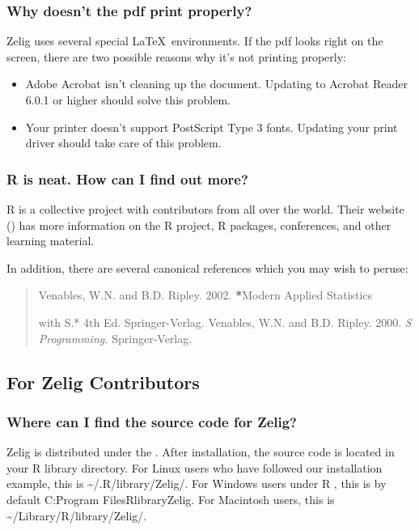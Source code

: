 \documentclass[letterpaper,10pt,english]{sphinxmanual}
\begin{document}
\subsubsection{Why doesn’t the pdf print properly?}
\label{docs/faq:why-doesnt-the-pdf-print-properly}
Zelig uses several special LaTeX environments. If the pdf looks right on
the screen, there are two possible reasons why it’s not printing
properly:
\begin{itemize}
\item {} 
Adobe Acrobat isn’t cleaning up the document. Updating to Acrobat
Reader 6.0.1 or higher should solve this problem.

\item {} 
Your printer doesn’t support PostScript Type 3 fonts. Updating your
print driver should take care of this problem.

\end{itemize}


\subsubsection{R is neat. How can I find out more?}
\label{docs/faq:r-is-neat-how-can-i-find-out-more}
R is a collective project with contributors from all over the world.
Their website () has more information on the R project, R packages,
conferences, and other learning material.

In addition, there are several canonical references which you may wish
to peruse:
\begin{quote}

\begin{DUlineblock}{0em}
\item[] Venables, W.N. and B.D. Ripley. 2002. {\color{red}\bfseries{}*}Modern Applied Statistics
\end{DUlineblock}

with S.* 4th Ed. Springer-Verlag.
\textbar{} Venables, W.N. and B.D. Ripley. 2000. \emph{S Programming.}
Springer-Verlag.
\end{quote}


\subsection{For Zelig Contributors}
\label{docs/faq:for-zelig-contributors}

\subsubsection{Where can I find the source code for Zelig?}
\label{docs/faq:where-can-i-find-the-source-code-for-zelig}
Zelig is distributed under the . After installation, the source code is
located in your R library directory. For Linux users who have followed
our installation example, this is \textasciitilde{}/.R/library/Zelig/. For Windows users
under R , this is by default C:Program
FilesRlibraryZelig.
For Macintosh users, this is \textasciitilde{}/Library/R/library/Zelig/.
\end{document}
